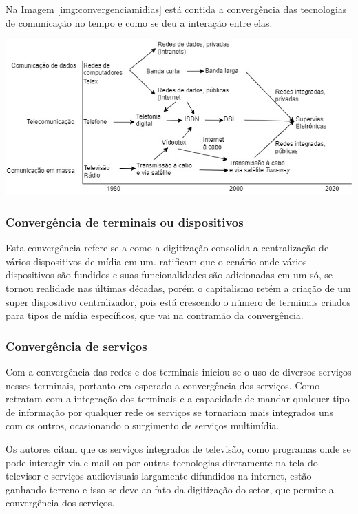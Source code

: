 Na Imagem \ref{img:convergenciamidias} está contida a convergência das tecnologias de comunicação no tempo e como se deu a interação entre elas.

\begin{center}
	\includegraphics[width=.90\linewidth]{figuras/integrationoftransmission.jpg}
	\label{img:convergenciamidias}
\end{center}

\subsubsection{Convergência de terminais ou dispositivos}

Esta convergência refere-se a como a digitização consolida a centralização de vários dispositivos de mídia em um. \cite[p.~2]{storsul2010} ratificam que o cenário onde vários dispositivos são fundidos e suas funcionalidades são adicionadas em um só, se tornou realidade nas últimas décadas, porém o capitalismo retém a criação de um super dispositivo centralizador, pois está crescendo o número de terminais criados para tipos de mídia específicos, que vai na contramão da convergência.

\subsubsection{Convergência de serviços}

Com a convergência das redes e dos terminais iniciou-se o uso de diversos serviços nesses terminais, portanto era esperado a convergência dos serviços. Como retratam \cite{storsul2010} com a integração dos terminais e a capacidade de mandar qualquer tipo de informação por qualquer rede os serviços se tornariam mais integrados uns com os outros, ocasionando o surgimento de serviços multimídia. 

Os autores citam que os serviços integrados de televisão, como programas onde se pode interagir via e-mail ou por outras tecnologias diretamente na tela do televisor e serviços audiovisuais largamente difundidos na internet, estão ganhando terreno e isso se deve ao fato da digitização do setor, que permite a convergência dos serviços.

